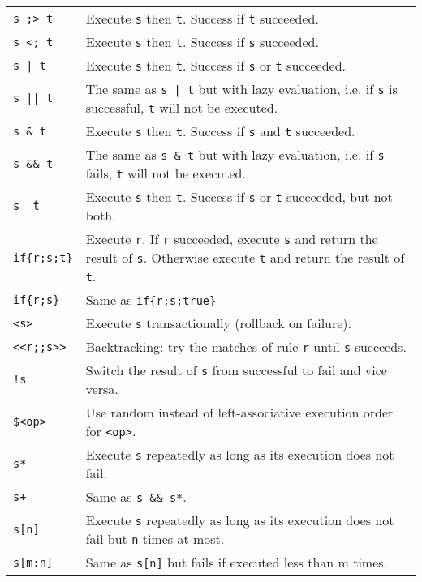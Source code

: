 \begin{table}[htbp]
\begin{minipage}{\linewidth} \renewcommand{\footnoterule}{} 
\begin{tabularx}{\linewidth}{|lX|}
\hline
\texttt{s ;> t}		& Execute \texttt{s} then \texttt{t}. Success if \texttt{t} succeeded.\\
\texttt{s <; t}		& Execute \texttt{s} then \texttt{t}. Success if \texttt{s} succeeded.\\
\texttt{s | t}		& Execute \texttt{s} then \texttt{t}. Success if \texttt{s} or \texttt{t} succeeded.\\
\texttt{s || t}	& The same as \texttt{s | t} but with lazy evaluation, i.e. if \texttt{s} is successful, \texttt{t} will not be executed.\\
\texttt{s \& t}	& Execute \texttt{s} then \texttt{t}. Success if \texttt{s} and \texttt{t} succeeded.\\
\texttt{s \&\& t}	& The same as \texttt{s \& t} but with lazy evaluation, i.e. if \texttt{s} fails, \texttt{t} will not be executed.\\
\texttt{s \^\ t}	& Execute \texttt{s} then \texttt{t}. Success if \texttt{s} or \texttt{t} succeeded, but not both.\\
\texttt{if\{r;s;t\}}	& Execute \texttt{r}. If \texttt{r} succeeded, execute \texttt{s} and return the result of \texttt{s}. Otherwise execute \texttt{t} and return the result of \texttt{t}.\\
\texttt{if\{r;s\}}	& Same as \texttt{if\{r;s;true\}}\\
\texttt{<s>}	& Execute \texttt{s} transactionally (rollback on failure).\\
\texttt{<<r;;s>>}	& Backtracking: try the matches of rule \texttt{r} until \texttt{s} succeeds.\\
\texttt{!s}		& Switch the result of \texttt{s} from successful to fail and vice versa.\\
\texttt{\$<op>}	& Use random instead of left-associative execution order for \texttt{<op>}. \\
\texttt{s*}		& Execute \texttt{s} repeatedly as long as its execution does not fail.\\
\texttt{s+}		& Same as \texttt{s \&\& s*}.\\
\texttt{s[n]}	& Execute \texttt{s} repeatedly as long as its execution does not fail but \texttt{n} times at most.\\
\texttt{s[m:n]}	& Same as \texttt{s[n]} but fails if executed less than m times.\\

\end{tabularx}
\end{minipage}
\end{table}
